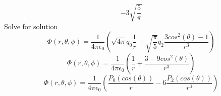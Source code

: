 \documentclass[12pt]{article}
\begin{document}
    \begin{equation} \label{eq: 4.1.10}
        -3 \sqrt{\frac{5}{\pi}}
    \end{equation}
    Solve for solution
    \begin{equation} \label{eq: 4.1.11}
        \Phi(r,\theta,\phi) = \frac{1}{4 \pi \epsilon_0} \left(\sqrt{4 \pi} q_0 \frac{1}{r} + \sqrt{\frac{\pi}{5}} q_2 \frac{3 cos^2(\theta) - 1}{r^3} \right)
    \end{equation}
    \begin{equation} \label{eq: 4.1.12}
        \Phi(r,\theta, \phi) = \frac{1}{4 \pi \epsilon_0} \left(\frac{1}{r} + \frac{3 - 9 cos^2(\theta)}{r^3} \right)
    \end{equation}
    \begin{equation} \label{eq: 4.1.13}
        \Phi(r,\theta, \phi) = \frac{1}{4 \pi \epsilon_0} \left(\frac{P_0(cos(\theta))}{r} -6 \frac{P_2(cos(\theta))}{r^3} \right)
    \end{equation}
    
\end{document}
